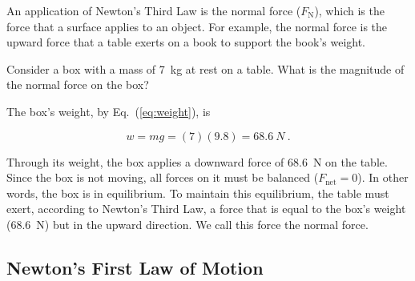 \documentclass[main.tex]{subfiles}
\begin{document}
\vspace{1em}

An application of Newton's Third Law is the \gls{normal force} ($F_{\text{N}}$), which is the force that a surface applies to an object. For example, the normal force is the upward force that a table exerts on a book to support the book's weight.

\begin{example} \label{A8Qdlc}
Consider a box with a mass of \SI{7}{kg} at rest on a table. What is the magnitude of the normal force on the box? 
\end{example}

\Solution The box's weight, by Eq.~(\ref{eq:weight}), is

\begin{equation*}
    w = m g = (7)(9.8) = \SI{68.6}{N}\ .
\end{equation*}

Through its weight, the box applies a downward force of \SI{68.6}{N} on the table. Since the box is not moving, all forces on it must be balanced ($F_{\text{net}} = 0$). In other words, the box is in equilibrium. To maintain this equilibrium, the table must exert, according to Newton's Third Law, a force that is equal to the box's weight (\SI{68.6}{N}) but in the upward direction. We call this force the normal force.

\begin{center}
\end{center}

\cyanhrule

\subsection{Newton's First Law of Motion} \label{XeoZti}
\end{document}

